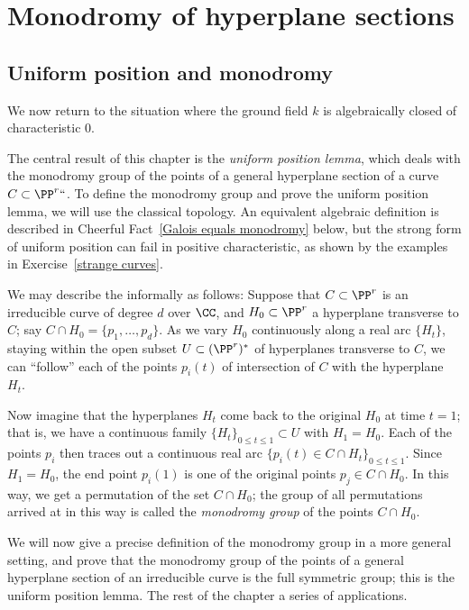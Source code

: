



\chapter{Monodromy of hyperplane sections}\label{uniform position}

\section{Uniform position and monodromy} \label{uniformSection}
We now return to the situation where the ground field $k$ is algebraically
closed of characteristic 0.

The central result of this chapter is the  
\emph{uniform position lemma}, 
%
which deals with the monodromy group 
of the points of a general
hyperplane section of a curve $C \subset \PP^r` `$. To define the
monodromy group  and prove the  uniform position lemma, we will use the
classical topology. An equivalent algebraic definition is described in
Cheerful Fact~\ref{Galois equals monodromy} below, but the strong form
of uniform position can fail in positive characteristic,
as shown by the examples in Exercise~\ref{strange curves}.

We may describe the 
%
informally as follows: Suppose that
$C \subset \PP^r$ is an irreducible curve of degree $d$ over $\CC$,
and $H_0 \subset \PP^r$ a hyperplane transverse to $C$; say $C \cap
H_0 = \{p_1,\dots,p_d\}$. As we vary $H_0$ continuously along a real
arc $\{H_t\}$, staying within the open subset $U \subset (\PP^r)^*$
of hyperplanes transverse to $C$, we can ``follow'' each of the points
$p_i(t)$ of intersection of $C$ with the hyperplane $H_t$.

Now imagine that the hyperplanes $H_t$ come back to the original $H_0$
at time $t=1$; that is, we have a continuous family $\{H_t\}_{0 \leq
t \leq 1} \subset U$ with $H_1 = H_0$. Each of the points $p_i$ then
traces out a continuous real arc
$\{p_i(t) \in C \cap H_t\}_{0 \leq t \leq 1}$. Since $H_1 = H_0$, the
end point $p_i(1)$ is one of the original points $p_j \in C \cap H_0$. In
this way, we get a permutation of the set $C \cap H_0$; the group of all
permutations arrived at in this way is called the \emph{monodromy group}
%
of the points $C \cap H_0$.

We will now give a precise definition of the monodromy group in a more
general setting, and prove that the monodromy group of the points of a
general hyperplane section of an irreducible curve
 is the full symmetric group; this is the uniform position lemma. The
 rest of the chapter 
a series of applications.

